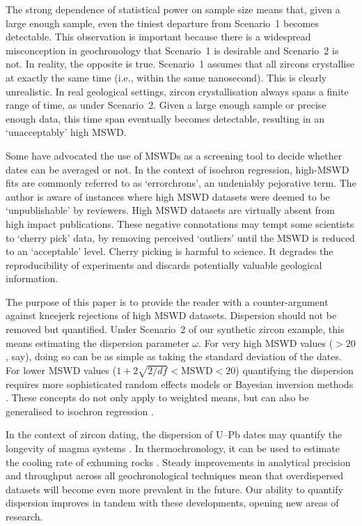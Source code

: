 \documentclass{article}
\begin{document}
The strong dependence of statistical power on sample size means that,
given a large enough sample, even the tiniest departure from
Scenario~1 becomes detectable. This observation is important because
there is a widespread misconception in geochronology that Scenario~1
is desirable and Scenario~2 is not. In reality, the opposite is
true. Scenario~1 assumes that all zircons crystallise at exactly the
same time (i.e., within the same nanosecond). This is clearly
unrealistic. In real geological settings, zircon crystallisation
always spans a finite range of time, as under Scenario~2. Given a
large enough sample or precise enough data, this time span eventually
becomes detectable, resulting in an `unacceptably' high MSWD.

Some have advocated the use of MSWDs as a screening tool to decide
whether dates can be averaged or not\cite{spencer2016}.  In the
context of isochron regression, high-MSWD fits are commonly referred
to as `errorchrons'\cite{brooks1972}, an undeniably pejorative
term. The author is aware of instances where high MSWD datasets were
deemed to be `unpublishable' by reviewers.  High MSWD datasets are
virtually absent from high impact publications.  These negative
connotations may tempt some scientists to `cherry pick' data, by
removing perceived `outliers' until the MSWD is reduced to an
`acceptable' level. Cherry picking is harmful to science. It degrades
the reproducibility of experiments and discards potentially valuable
geological information.

The purpose of this paper is to provide the reader with a
counter-argument against kneejerk rejections of high MSWD datasets.
Dispersion should not be removed but quantified. Under Scenario~2 of
our synthetic zircon example, this means estimating the dispersion
parameter $\omega$. For very high MSWD values ($>20$, say), doing so
can be as simple as taking the standard deviation of the dates. For
lower MSWD values ($1+2\sqrt{2/d\!f}<\mbox{MSWD}<20$) quantifying the
dispersion requires more sophisticated random effects models
\cite{galbraith1993} or Bayesian inversion methods
\cite{keller2018}. These concepts do not only apply to weighted means,
but can also be generalised to isochron regression
\cite{vermeesch2024}.

In the context of zircon dating, the dispersion of U--Pb dates may
quantify the longevity of magma systems \cite{rioux2012}. In
thermochronology, it can be used to estimate the cooling rate of
exhuming rocks \cite{galbraith1993}.  Steady improvements in
analytical precision and throughput across all geochronological
techniques mean that overdispersed datasets will become even more
prevalent in the future. Our ability to quantify dispersion improves
in tandem with these developments, opening new areas of research.
\end{document}

